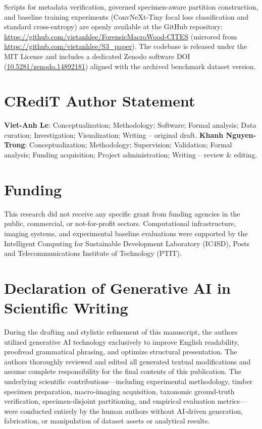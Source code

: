 \documentclass[a4paper,fleqn,12pt]{cas-sc}
\begin{document}
Scripts for metadata verification, governed specimen-aware partition construction, and baseline training experiments (ConvNeXt-Tiny focal loss classification and standard cross-entropy) are openly available at the GitHub repository: \url{https://github.com/vietanhlee/ForensicMacroWood-CITES} (mirrored from \url{https://github.com/vietanhlee/S3_paper}). The codebase is released under the MIT License and includes a dedicated Zenodo software DOI (\href{https://doi.org/10.5281/zenodo.14892181}{10.5281/zenodo.14892181}) aligned with the archived benchmark dataset version.

\section*{CRediT Author Statement}

\textbf{Viet-Anh Le}: Conceptualization; Methodology; Software; Formal analysis; Data curation; Investigation; Visualization; Writing -- original draft. \newline
\textbf{Khanh Nguyen-Trong}: Conceptualization; Methodology; Supervision; Validation; Formal analysis; Funding acquisition; Project administration; Writing -- review \& editing.

\section*{Funding}

This research did not receive any specific grant from funding agencies in the public, commercial, or not-for-profit sectors. Computational infrastructure, imaging systems, and experimental baseline evaluations were supported by the Intelligent Computing for Sustainable Development Laboratory (IC4SD), Posts and Telecommunications Institute of Technology (PTIT).

\section*{Declaration of Generative AI in Scientific Writing}

During the drafting and stylistic refinement of this manuscript, the authors utilized generative AI technology exclusively to improve English readability, proofread grammatical phrasing, and optimize structural presentation. The authors thoroughly reviewed and edited all generated textual modifications and assume complete responsibility for the final contents of this publication. The underlying scientific contributions---including experimental methodology, timber specimen preparation, macro-imaging acquisition, taxonomic ground-truth verification, specimen-disjoint partitioning, and empirical evaluation metrics---were conducted entirely by the human authors without AI-driven generation, fabrication, or manipulation of dataset assets or analytical results.
\end{document}
